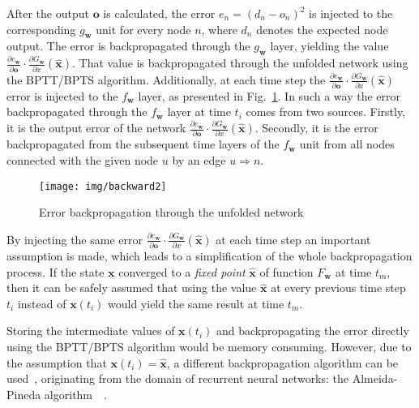 After the output $\bm{o}$ is calculated, the error $e_n = (d_n - o_n)^2$ is injected to the corresponding $g_{\bm{w}}$ unit for every node $n$, where $d_n$ denotes the expected node output. The error is backpropagated through the $g_{\bm{w}}$ layer, yielding the value $\frac{\partial e_{\bm{w}}}{\partial \bm{o}}\cdot \frac{\partial G_{\bm{w}}}{\partial x}(\hat{\bm{x}})$. That value is backpropagated through the unfolded network using the BPTT/BPTS algorithm. Additionally, at each time step the $\frac{\partial e_{\bm{w}}}{\partial \bm{o}}\cdot \frac{\partial G_{\bm{w}}}{\partial x}(\hat{\bm{x}})$ error is injected to the $f_{\bm{w}}$ layer, as presented in Fig.~\ref{fig:gnn_backward}. In such a way the error backpropagated through the $f_{\bm{w}}$ layer at time $t_i$ comes from two sources. Firstly, it is the output error of the network $\frac{\partial e_{\bm{w}}}{\partial \bm{o}}\cdot \frac{\partial G_{\bm{w}}}{\partial x}(\hat{\bm{x}})$. Secondly, it is the error backpropagated from the subsequent time layers of the $f_{\bm{w}}$ unit from all nodes connected with the given node $u$ by an edge $u \Rightarrow n$.

\begin{figure}[h!]
\begin{center}
	\texttt{[image: img/backward2]}
	\caption{Error backpropagation through the unfolded network}
	\label{fig:gnn_backward}
\end{center}
\end{figure}

By injecting the same error $\frac{\partial e_{\bm{w}}}{\partial \bm{o}}\cdot \frac{\partial G_{\bm{w}}}{\partial x}(\hat{\bm{x}})$ at each time step an important assumption is made, which leads to a simplification of the whole backpropagation process. If the state $\bm{x}$ converged to a \emph{fixed point} $\hat{\bm{x}}$ of function $F_{\bm{w}}$ at time $t_m$, then it can be safely assumed that using the value $\hat{\bm{x}}$ at every previous time step $t_i$ instead of $\bm{x}(t_i)$ would yield the same result at time $t_m$.

Storing the intermediate values of $\bm{x}(t_i)$ and backpropagating the error directly using the BPTT/BPTS algorithm would be memory consuming. However, due to the assumption that $\bm{x}(t_i) = \hat{\bm{x}}$, a different backpropagation algorithm can be used~\cite{scarselli2009graph}, originating from the domain of recurrent neural networks: the Almeida-Pineda algorithm~\cite{pineda1987generalization}~\cite{williams1995gradient}.

